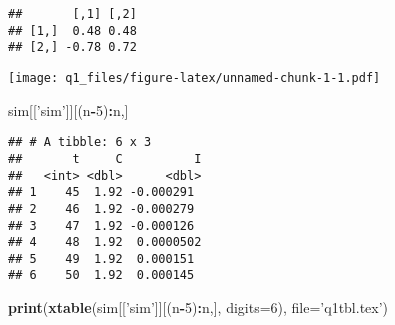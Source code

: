 \documentclass[]{article}
\newenvironment{Shaded}{\begin{snugshade}}{\end{snugshade}}
\newcommand{\KeywordTok}[1]{\textcolor[rgb]{0.13,0.29,0.53}{\textbf{#1}}}
\newcommand{\DataTypeTok}[1]{\textcolor[rgb]{0.13,0.29,0.53}{#1}}
\newcommand{\DecValTok}[1]{\textcolor[rgb]{0.00,0.00,0.81}{#1}}
\newcommand{\FloatTok}[1]{\textcolor[rgb]{0.00,0.00,0.81}{#1}}
\newcommand{\StringTok}[1]{\textcolor[rgb]{0.31,0.60,0.02}{#1}}
\newcommand{\ControlFlowTok}[1]{\textcolor[rgb]{0.13,0.29,0.53}{\textbf{#1}}}
\newcommand{\OperatorTok}[1]{\textcolor[rgb]{0.81,0.36,0.00}{\textbf{#1}}}
\newcommand{\NormalTok}[1]{#1}
\begin{document}
\begin{verbatim}
##       [,1] [,2]
## [1,]  0.48 0.48
## [2,] -0.78 0.72
\end{verbatim}

\begin{Shaded}
\end{Shaded}

\texttt{[image: q1\_files/figure-latex/unnamed-chunk-1-1.pdf]}

\begin{Shaded}
\begin{Highlighting}[]
\NormalTok{sim[[}\StringTok{'sim'}\NormalTok{]][(n}\OperatorTok{-}\DecValTok{5}\NormalTok{)}\OperatorTok{:}\NormalTok{n,]}
\end{Highlighting}
\end{Shaded}

\begin{verbatim}
## # A tibble: 6 x 3
##       t     C          I
##   <int> <dbl>      <dbl>
## 1    45  1.92 -0.000291 
## 2    46  1.92 -0.000279 
## 3    47  1.92 -0.000126 
## 4    48  1.92  0.0000502
## 5    49  1.92  0.000151 
## 6    50  1.92  0.000145
\end{verbatim}

\begin{Shaded}
\begin{Highlighting}[]
\KeywordTok{print}\NormalTok{(}\KeywordTok{xtable}\NormalTok{(sim[[}\StringTok{'sim'}\NormalTok{]][(n}\OperatorTok{-}\DecValTok{5}\NormalTok{)}\OperatorTok{:}\NormalTok{n,], }\DataTypeTok{digits=}\DecValTok{6}\NormalTok{), }\DataTypeTok{file=}\StringTok{'q1tbl.tex'}\NormalTok{)}
\end{Highlighting}
\end{Shaded}
\end{document}
